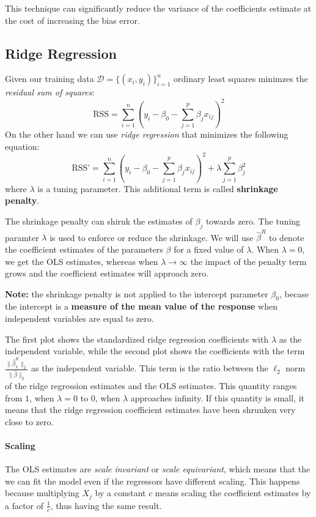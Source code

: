 This technique can significantly reduce the variance of the coefficients estimate at the cost of increasing the bias error.

\subsection*{Ridge Regression}
Given our training data $\mathcal{D} = \{(x_i, y_i)\}_{i=1}^n $ ordinary least squares minimzes the \textit{residual sum of squares}:
\[
    \text{RSS} = \sum_{i=1}^{n} \left(y_i - \beta_0 - \sum_{j=1}^{p} \beta_j x_{ij}\right)^2
\]
On the other hand we can use \textit{ridge regression} that minimizes the following equation:
\[
    \text{RSS'} = \sum_{i=1}^{n} \left(y_i - \beta_0 - \sum_{j=1}^{p} \beta_j x_{ij}\right)^2 + \lambda \sum_{j=1}^{p} \beta_j^2
\]
where $\lambda$ is a tuning parameter. This additional term is called \textbf{shrinkage penalty}.

The shrinkage penalty can shirnk the estimates of $\beta_j$ towards zero. The tuning paramter $\lambda$ is used to enforce or reduce the shrinkage. We will use $\hat{\beta}^R$ to denote the coefficient estimates of the parameters $\beta$ for a fixed value of $\lambda$. When $\lambda = 0$, we get the OLS estimates, whereas when $\lambda \to \infty$ the impact of the penalty term grows and the coefficient estimates will approach zero.

\textbf{Note:} the shrinkage penalty is not applied to the intercept parameter $\beta_0$, becase the intercept is a \textbf{measure of the mean value of the response} when independent variables are equal to zero.

The first plot shows the standardized ridge regression coefficients with $\lambda$ as the independent variable, while the second plot shows the coefficients with the term $\frac{\lVert \hat{\beta}_\lambda^R \rVert_2}{ \lVert \hat{\beta} \rVert_2}$ as the independent variable. This term is the ratio between the $\ell_2$ norm of the ridge regression estimates and the OLS estimates. This quantity ranges from $1$, when $\lambda = 0$ to $0$, when $\lambda$ approaches infinity. If this quantity is small, it means that the ridge regression coefficient estimates have been shrunken very close to zero.

\paragraph*{Scaling}
The OLS estimates are \textit{scale invariant} or \textit{scale equivariant}, which means that the we can fit the model even if the regressors have different scaling. This happens because multiplying $X_j$ by a constant $c$ means scaling the coefficient estimates by a factor of $\frac{1}{c}$, thus having the same result.

